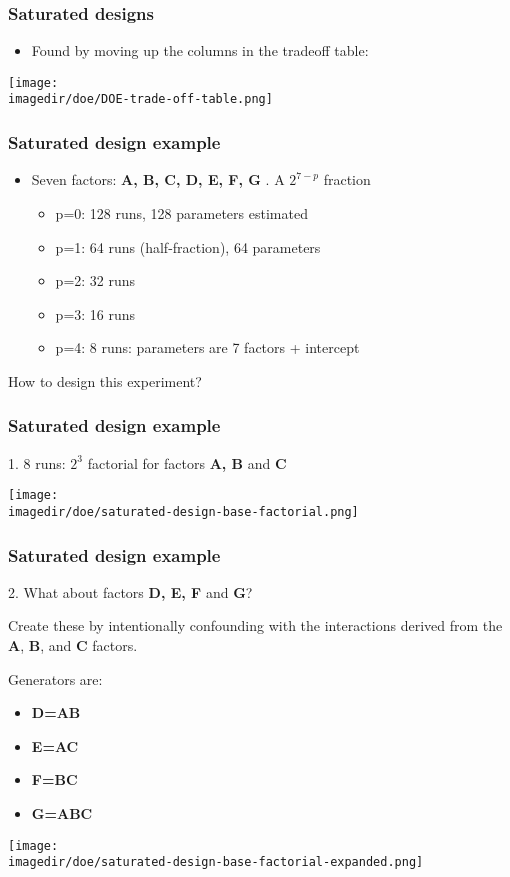 \begin{frame}\frametitle{Saturated designs}
	\begin{itemize}
		\item	Found by moving up the columns in the tradeoff table:
	\end{itemize}
	\begin{center}
		\texttt{[image: \\imagedir/doe/DOE-trade-off-table.png]}
	\end{center}
\end{frame}

\begin{frame}\frametitle{Saturated design example}
	\begin{itemize}
		\item	Seven factors: \textbf{A, B, C, D, E, F, G }. A $2^{7-p}$ fraction
		\begin{itemize}
			\item	p=0: 128 runs, 128 parameters estimated
			\item	p=1: 64 runs (half-fraction), 64 parameters
			\item	p=2: 32 runs
			\item	p=3: 16 runs
			\item	p=4: 8 runs: parameters are 7 factors + intercept
		\end{itemize}
	\end{itemize}

	How to design this experiment?
\end{frame}

\begin{frame}\frametitle{Saturated design example}

	1. 8 runs: $2^3$ factorial for factors \textbf{A, B} and \textbf{C}
	\begin{center}
		\texttt{[image: \\imagedir/doe/saturated-design-base-factorial.png]}
	\end{center}
\end{frame}

\begin{frame}\frametitle{Saturated design example}

	2. What about factors \textbf{D, E, F} and \textbf{G}?

	Create these by intentionally confounding with the interactions derived from the \textbf{A}, \textbf{B}, and \textbf{C} factors.

	Generators are:
	\begin{itemize}
		\item	\textbf{D=AB}
		\item	\textbf{E=AC}
		\item	\textbf{F=BC}
		\item	\textbf{G=ABC}
	\end{itemize}
	\begin{center}
		\texttt{[image: \\imagedir/doe/saturated-design-base-factorial-expanded.png]}
	\end{center}
\end{frame}

